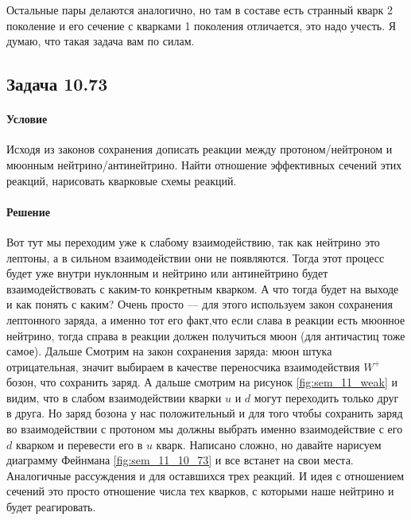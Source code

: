 \documentclass[12pt]{article}
\begin{document}
Остальные пары делаются аналогично, но там в составе есть странный кварк 2 поколение и его сечение с кварками 1 поколения отличается, это надо учесть. Я думаю, что такая задача вам по силам.


\subsection{Задача 10.73}
\label{task_}
\paragraph{Условие}
Исходя из законов сохранения дописать реакции между протоном/нейтроном и мюонным нейтрино/антинейтрино. Найти отношение эффективных сечений этих реакций, нарисовать кварковые схемы реакций.
\paragraph{Решение}
Вот тут мы переходим уже к слабому взаимодействию, так как нейтрино это лептоны, а в сильном взаимодействии они не появляются. Тогда этот процесс будет уже внутри нуклонным и нейтрино или антинейтрино будет взаимодействовать с каким-то конкретным кварком. А что тогда будет на выходе и как понять с каким? Очень просто --- для этого используем закон сохранения лептонного заряда, а именно тот его факт,что если слава в реакции есть мюонное нейтрино, тогда справа в реакции должен получиться мюон (для античастиц тоже самое). Дальше Смотрим на закон сохранения заряда: мюон штука отрицательная, значит выбираем в качестве переносчика взаимодействия $W^+$ бозон, что сохранить заряд. А дальше смотрим на рисунок \ref{fig:sem_11_weak} и видим, что в слабом взаимодействии кварки $u$ и $d$ могут переходить только друг в друга. Но заряд бозона у нас положительный и для того чтобы сохранить заряд во взаимодействии с протоном мы должны выбрать именно взаимодействие с его $d$ кварком и перевести его в $u$ кварк. Написано сложно, но давайте нарисуем диаграмму Фейнмана \ref{fig:sem_11_10_73} и все встанет на свои места. Аналогичные рассуждения и для оставшихся трех реакций. И идея с отношением сечений это просто отношение числа тех кварков, с которыми наше нейтрино и будет реагировать.
\end{document}
